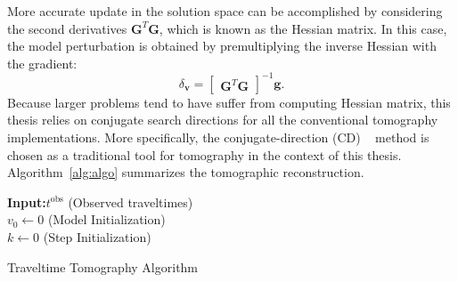 More accurate update in the solution space can be accomplished by considering the second derivatives $\mathbf{G}^T\mathbf{G}$, which is known as the Hessian matrix. In this case, the model perturbation is obtained by premultiplying the inverse Hessian with the gradient:
\begin{equation}
    \label{eqn:model_perturbation}
    \delta_\mathbf{v} = \begin{bmatrix} \mathbf{G}^T \mathbf{G}\end{bmatrix}^{-1}\mathbf{g}.
\end{equation}
Because larger problems tend to have suffer from computing Hessian matrix, this thesis relies on conjugate search directions for all the conventional tomography implementations. More specifically, the conjugate-direction (CD) ~\cite{c:14} method is chosen as a traditional tool for tomography in the context of this thesis. Algorithm~\ref{alg:algo} summarizes the tomographic reconstruction. 

\begin{algorithm}[H]
	\SetAlgoLined
	\DontPrintSemicolon %
	\textbf{Input:}{$t^\text{obs}$} (Observed traveltimes)\\
	$v_0 \leftarrow 0$ (Model Initialization)\\
	$k \leftarrow 0$ (Step Initialization)\\
	\caption{Traveltime Tomography Algorithm}
	\label{alg:algo}
\end{algorithm}

